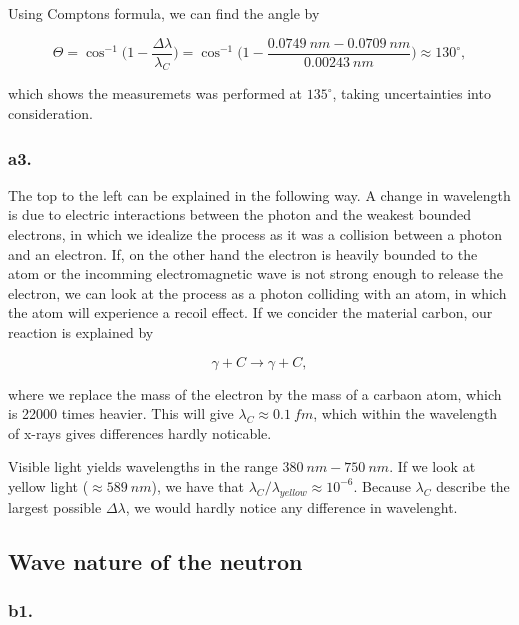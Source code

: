 \documentclass{article}
\begin{document}
Using Comptons formula, we can find the angle by

\begin{equation}
\Theta = \cos^{-1}{\big( 1 - \frac{\Delta \lambda}{\lambda_C} \big)} = \cos^{-1}{\big(1 - \frac{0.0749 \ nm - 0.0709 \ nm}{0.00243 \ nm} \big)} \approx 130^{\circ},
\end{equation}

which shows the measuremets was performed at $135^{\circ}$, taking uncertainties into consideration.

\subsubsection*{a3.}

The top to the left can be explained in the following way. A change in wavelength is due to electric interactions between the photon and the weakest bounded electrons, in which we idealize the process as it was a collision between a photon and an electron. If, on the other hand the electron is heavily bounded to the atom or the incomming electromagnetic wave is not strong enough to release the electron, we can look at the process as a photon colliding with an atom, in which the atom will experience a recoil effect. If we concider the material carbon, our reaction is explained by

\begin{equation}
\gamma + C \rightarrow \gamma + C, 
\end{equation}

where we replace the mass of the electron by the mass of a carbaon atom, which is 22000 times heavier. This will give $\lambda_C \approx 0.1 \ fm$, which within the wavelength of x-rays gives differences hardly noticable.

\bigskip

Visible light yields wavelengths in the range $380 \ nm - 750 \ nm$. If we look at yellow light ($\approx 589 \ nm$), we have that $\lambda_C/\lambda_{yellow} \approx 10^{-6}$. Because $\lambda_C$ describe the largest possible $\Delta\lambda$, we would hardly notice any difference in wavelenght.

\subsection*{Wave nature of the neutron}

\subsubsection*{b1.}
\end{document}

